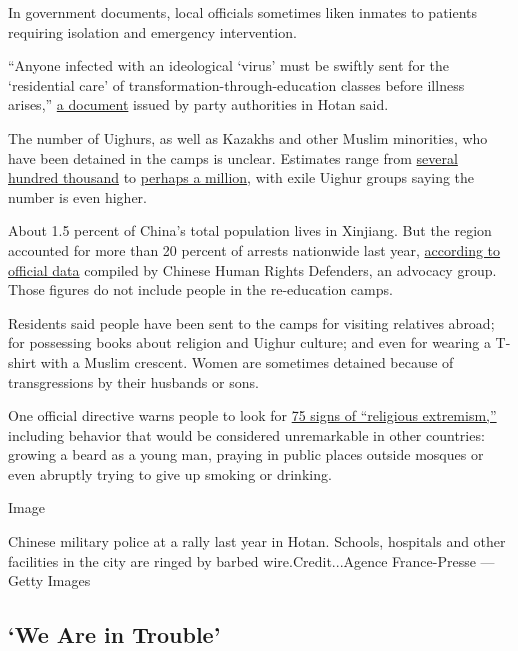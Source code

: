 In government documents, local officials sometimes liken inmates to
patients requiring isolation and emergency intervention.

``Anyone infected with an ideological `virus' must be swiftly sent for
the `residential care' of transformation-through-education classes
before illness arises,''
\href{http://www.pinlue.com/article/2017/04/1221/211147275246.html}{a
document} issued by party authorities in Hotan said.

The number of Uighurs, as well as Kazakhs and other Muslim minorities,
who have been detained in the camps is unclear. Estimates range from
\href{https://jamestown.org/program/evidence-for-chinas-political-re-education-campaign-in-xinjiang/}{several
hundred thousand} to
\href{https://www.nytimes3xbfgragh.onion/2018/08/10/world/asia/china-xinjiang-un-uighurs.html}{perhaps
a million}, with exile Uighur groups saying the number is even higher.

About 1.5 percent of China's total population lives in Xinjiang. But the
region accounted for more than 20 percent of arrests nationwide last
year,
\href{https://www.nchrd.org/2018/07/criminal-arrests-in-xinjiang-account-for-21-of-chinas-total-in-2017/}{according
to official data} compiled by Chinese Human Rights Defenders, an
advocacy group. Those figures do not include people in the re-education
camps.

Residents said people have been sent to the camps for visiting relatives
abroad; for possessing books about religion and Uighur culture; and even
for wearing a T-shirt with a Muslim crescent. Women are sometimes
detained because of transgressions by their husbands or sons.

One official directive warns people to look for
\href{http://www.cssn.cn/zjx/zjx_zjsj/201412/t20141224_1454905.shtml}{75
signs of ``religious extremism,''} including behavior that would be
considered unremarkable in other countries: growing a beard as a young
man, praying in public places outside mosques or even abruptly trying to
give up smoking or drinking.

Image

Chinese military police at a rally last year in Hotan. Schools,
hospitals and other facilities in the city are ringed by barbed
wire.Credit...Agence France-Presse --- Getty Images

\hypertarget{we-are-in-trouble}{%
\subsection{`We Are in Trouble'}\label{we-are-in-trouble}}

